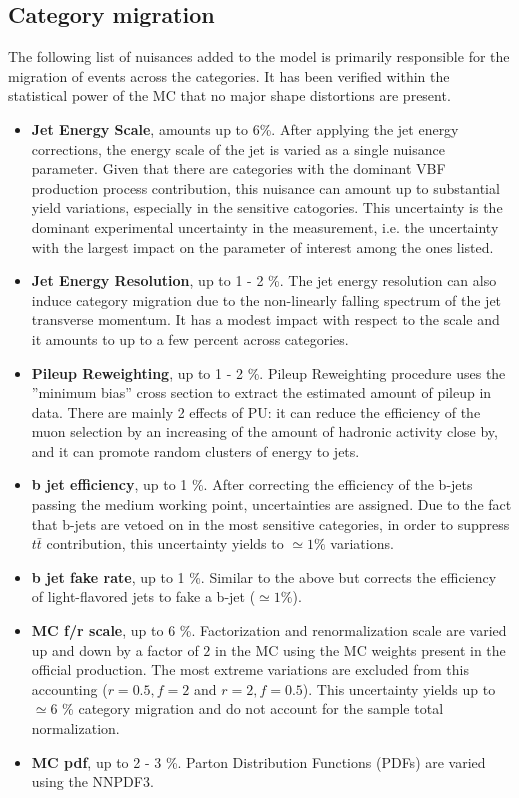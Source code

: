 \subsection{Category migration}
The following list of nuisances added to the model is primarily responsible for the migration of events across the categories. It has been verified within the statistical power of the MC that no major shape distortions are present.
\begin{itemize}
    \item {\bf Jet Energy Scale}, amounts up to 6\%. After applying the jet energy corrections, the energy scale of the jet is varied as a single nuisance parameter.
    Given that there are categories with the dominant VBF production process contribution, this nuisance can amount up to substantial yield variations, especially in the sensitive catogories. This uncertainty is the dominant experimental uncertainty in the measurement, i.e. the uncertainty with the largest impact on the parameter of interest among the ones listed.
    \item {\bf Jet Energy Resolution}, up to 1 - 2 \%. The jet energy resolution can also induce category migration due to the non-linearly falling spectrum of the jet transverse momentum. It has a modest impact with respect to the scale and it amounts to up to a few percent across categories.
    \item {\bf Pileup Reweighting}, up to 1 - 2 \%. Pileup Reweighting procedure uses the ''minimum bias'' cross section to extract the estimated amount of pileup in data. There are mainly 2 effects of PU: it can reduce the efficiency of the muon selection by an increasing of the amount of hadronic activity close by, and it can promote random clusters of energy to jets.
    \item {\bf b jet efficiency}, up to 1 \%. After correcting the efficiency of the b-jets passing the medium working point, uncertainties are assigned. Due to the fact that b-jets are vetoed on in the most sensitive categories, in order to suppress {$t\bar{t}$} contribution, this uncertainty yields to $\simeq 1 \%$ variations.
    \item {\bf b jet fake rate}, up to 1 \%. Similar to the above but corrects the efficiency of light-flavored jets to fake a b-jet ($\simeq 1 \%$).
    \item {\bf MC f/r scale}, up to 6 \%. Factorization and renormalization scale are varied up and down by a factor of $2$ in the MC using the MC weights present in the official production. The most extreme variations are excluded from this accounting ($r=0.5,f=2$ and $r=2,f=0.5$). This uncertainty yields up to $\simeq 6$ \% category migration and do not account for the sample total normalization.
    \item {\bf MC pdf}, up to 2 - 3 \%. Parton Distribution Functions (PDFs) are varied using the NNPDF3.
\end{itemize}
